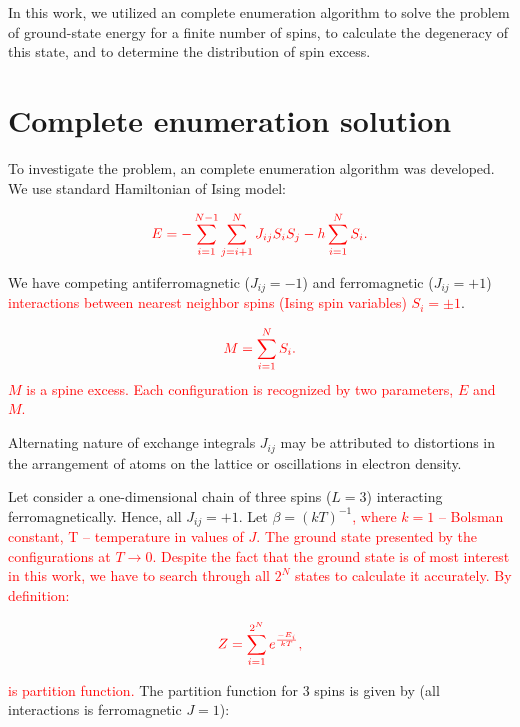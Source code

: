 \documentclass[preprint,12pt]{elsarticle}
\begin{document}
In this work, we utilized an complete enumeration algorithm \cite{dias2023ground, padalko2021parallel} to solve the problem of ground-state energy for a finite number of spins, to calculate the degeneracy of this state, and to determine the distribution of spin excess.

\section{Complete enumeration solution}

To investigate the problem, an complete enumeration algorithm was developed. We use standard Hamiltonian of Ising model:

\begin{equation}
	\color{red}
	E = -\sum^{N - 1}_{i=1}\sum^N_{j = i + 1} J_{ij} S_i S_j - h \sum^N_{i=1} S_i.
	\label{eq:ising_energy}
\end{equation}

We have competing antiferromagnetic ($J_{ij} = -1$) and ferromagnetic ($J_{ij} = +1$) \textcolor{red}{interactions between nearest neighbor spins (Ising spin variables) $S_i = \pm1$}. 

\begin{equation}
	\color{red}
	M = \sum^N_{i=1} S_i.
	\label{eq:spin_excess} 
\end{equation}
\textcolor{red}{$M$ is a spine excess. Each configuration is recognized by two parameters, $E$ and $M$.}


Alternating nature of exchange integrals $J_{ij}$ may be attributed to distortions in the arrangement of atoms on the lattice or oscillations in electron density.

Let consider a one-dimensional chain of three spins ($L = 3$) interacting ferromagnetically. Hence, all $J_{ij} = +1$. Let $\beta = (kT)^{-1}$\textcolor{red}{, where $k = 1$ -- Bolsman constant, T -- temperature in values of $J$. The ground state presented by the configurations at $T \rightarrow 0$. Despite the fact that the ground state is of most interest in this work, we have to search through all $2^N$ states to calculate it accurately. By definition:}

\begin{equation}
	\color{red}
	Z = \sum_{i = 1}^{2 ^ N} e^{\frac{-E_i}{kT}},
	\label{eq:stat_difinition}
\end{equation}

\noindent \textcolor{red}{is partition function.} The partition function for 3 spins is given by (all interactions is ferromagnetic $J = 1$):
\end{document}

